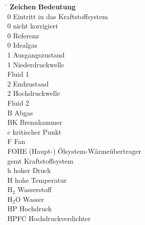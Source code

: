 \begin{tabbing}
	\hspace*{3cm} \= \hspace*{8cm} \kill
	\textbf{Zeichen} \> \textbf{Bedeutung} 							\\[5mm]
	0		\>	Eintritt in das Kraftstoffsystem					\\
    0		\>	nicht korrigiert					                \\
    0       \>  Referenz 						                    \\
    0       \>  Idealgas                                            \\
	1		\>	Ausgangszustand                                     \\
    1       \>  Niederdruckwelle                                    \\
     \> Fluid 1                                              \\
	2		\>	Endzustand								            \\
    2       \>  Hochdruckwelle                                      \\
     \> Fluid 2                                              \\
    B       \>  Abgas                                               \\
    BK      \>  Brennkammer                                         \\
    $c$     \>  kritischer Punkt                                    \\
    F       \>  Fan                                                 \\
    FOHE    \>  (Haupt-) Ölsystem-Wärmeübertrager                   \\
    gsmt    \>  Kraftstoffsystem                                    \\
    h       \>  hoher Druck                                         \\
    H       \>  hohe Temperatur                                     \\
    H$_2$   \>  Wasserstoff                                         \\
    H$_2$O  \>  Wasser                                              \\
    HP      \>  Hochdruck                                           \\
    HPFC    \>  Hochdruckverdichter                                 \\

\end{tabbing}
